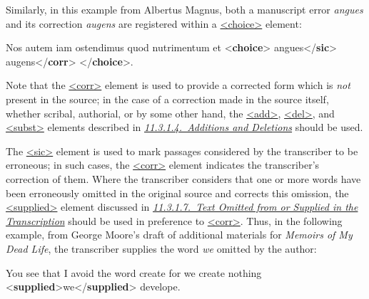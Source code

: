 Similarly, in this example from Albertus Magnus, both a manuscript error \textit{angues} and its correction \textit{augens} are registered within a \hyperref[TEI.choice]{<choice>} element: \par\bgroup{}\exampleFont \begin{shaded}\noindent\mbox{}Nos autem iam\mbox{}\newline 
 ostendimus quod nutrimentum et\mbox{}\newline 
{<\textbf{choice}>}\mbox{}\newline 
{}angues{</\textbf{sic}>}\mbox{}\newline 
{}augens{</\textbf{corr}>}\mbox{}\newline 
{</\textbf{choice}>}.\end{shaded}\egroup\par \par
Note that the \hyperref[TEI.corr]{<corr>} element is used to provide a corrected form which is \textit{not} present in the source; in the case of a correction made in the source itself, whether scribal, authorial, or by some other hand, the \hyperref[TEI.add]{<add>}, \hyperref[TEI.del]{<del>}, and \hyperref[TEI.subst]{<subst>} elements described in \textit{\hyperref[PHAD]{11.3.1.4.\ Additions and Deletions}} should be used.\par
The \hyperref[TEI.sic]{<sic>} element is used to mark passages considered by the transcriber to be erroneous; in such cases, the \hyperref[TEI.corr]{<corr>} element indicates the transcriber's correction of them. Where the transcriber considers that one or more words have been erroneously omitted in the original source and corrects this omission, the \hyperref[TEI.supplied]{<supplied>} element discussed in \textit{\hyperref[PHOM]{11.3.1.7.\ Text Omitted from or Supplied in the Transcription}} should be used in preference to \hyperref[TEI.corr]{<corr>}. Thus, in the following example, from George Moore's draft of additional materials for \textit{Memoirs of My Dead Life}, the transcriber supplies the word \textit{we} omitted by the author: \par\bgroup{}\exampleFont \begin{shaded}\noindent\mbox{}You see that I avoid\mbox{}\newline 
 the word create for we create nothing {<\textbf{supplied}>}we{</\textbf{supplied}>} develope.\end{shaded}\egroup\par \par
